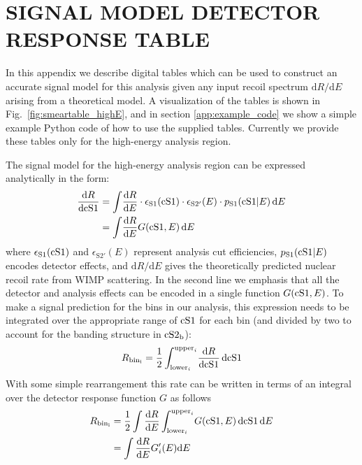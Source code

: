 
\section{SIGNAL MODEL DETECTOR RESPONSE TABLE}
\label{app:response_table}

In this appendix we describe digital tables which can be used to construct an accurate signal model for this analysis given any input recoil spectrum $\mathrm{d}R/\mathrm{d}E$ arising from a theoretical model. A visualization of the tables is shown in Fig.~\ref{fig:smeartable_highE}, and in section \ref{app:example_code} we show a simple example Python code of how to use the supplied tables. Currently we provide these tables only for the high-energy analysis region.

The signal model for the high-energy analysis region can be expressed analytically in the form:
%
\begin{align}
\label{eq:high2D}
  \frac{\mathrm{d} R}{\mathrm{d}\mathrm{cS1}} &= \int \! \frac{\mathrm{d}R}{\mathrm{d}E} \cdot \epsilon_\mathrm{S1}(\mathrm{cS1}) \cdot \epsilon_\mathrm{S2'}(E) \cdot p_\mathrm{S1}(\mathrm{\mathrm{cS1}}|E) \, \mathrm{d}E \\
  &= \int \! \frac{\mathrm{d}R}{\mathrm{d}E} G(\mathrm{cS1},E) \, \mathrm{d}E
\end{align}
%
where $\epsilon_\mathrm{S1}(\mathrm{cS1})$ and $\epsilon_\mathrm{S2'}(E)$ represent analysis cut efficiencies, $p_\mathrm{S1}(\mathrm{\mathrm{cS1}}|E)$ encodes detector effects, and $\mathrm{d}R/\mathrm{d}E$ gives the theoretically predicted nuclear recoil rate from WIMP scattering. In the second line we emphasis that all the detector and analysis effects can be encoded in a single function $G(\mathrm{cS1},E)$. To make a signal prediction for the bins in our analysis, this expression needs to be integrated over the appropriate range of $\mathrm{cS1}$ for each bin (and divided by two to account for the banding structure in $\mathrm{cS2}_\mathrm{b}$):
%
\begin{equation}
  R_\mathrm{bin_i} = \frac{1}{2}\int_{\mathrm{lower}_i}^{\mathrm{upper}_i} \! \frac{\mathrm{d} R}{\mathrm{d}\mathrm{cS1}} \, \mathrm{d}\mathrm{cS1}
\end{equation}
%
With some simple rearrangement this rate can be written in terms of an integral over the detector response function $G$ as follows
%
\begin{align}
  R_\mathrm{bin_i} &= \frac{1}{2}\int\frac{\mathrm{d} R}{\mathrm{d}E}\int_{\mathrm{lower}_i}^{\mathrm{upper}_i} \! G(\mathrm{cS1},E) \, \mathrm{d}\mathrm{cS1} \, \mathrm{d}E \\
 &= \int\frac{\mathrm{d} R}{\mathrm{d}E} G'_i(E) \mathrm{d}E
\end{align}
